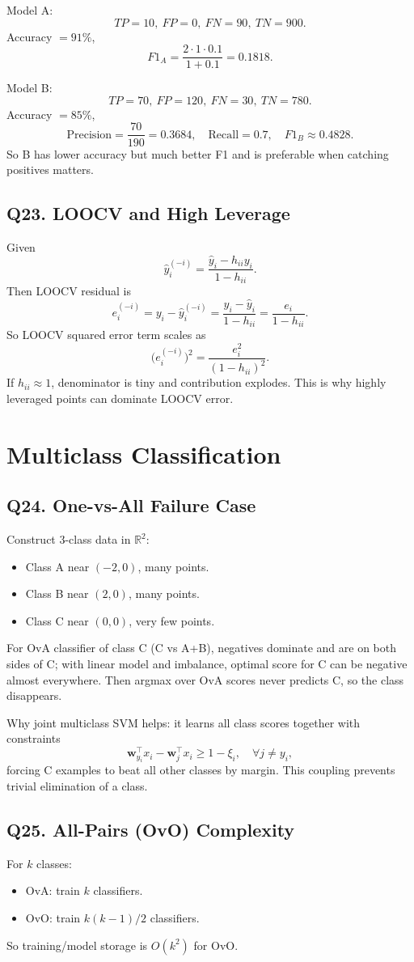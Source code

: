 \documentclass[11pt]{article}
\newcommand{\R}{\mathbb{R}}
\newcommand{\1}{\mathbf{1}}
\newcommand{\ww}{\mathbf{w}}
\begin{document}
Model A:
\[
TP=10,\ FP=0,\ FN=90,\ TN=900.
\]
Accuracy $=91\%$,
\[
F1_A=\frac{2\cdot1\cdot0.1}{1+0.1}=0.1818.
\]

Model B:
\[
TP=70,\ FP=120,\ FN=30,\ TN=780.
\]
Accuracy $=85\%$,
\[
\text{Precision}=\frac{70}{190}=0.3684,\quad
\text{Recall}=0.7,
\quad F1_B\approx0.4828.
\]
So B has lower accuracy but much better F1 and is preferable when catching positives matters.

\subsection*{Q23. LOOCV and High Leverage}
Given
\[
\hat y_i^{(-i)}=\frac{\hat y_i-h_{ii}y_i}{1-h_{ii}}.
\]
Then LOOCV residual is
\[
e_i^{(-i)}=y_i-\hat y_i^{(-i)}
=\frac{y_i-\hat y_i}{1-h_{ii}}=\frac{e_i}{1-h_{ii}}.
\]
So LOOCV squared error term scales as
\[
\big(e_i^{(-i)}\big)^2=\frac{e_i^2}{(1-h_{ii})^2}.
\]
If $h_{ii}\approx1$, denominator is tiny and contribution explodes. This is why highly leveraged points can dominate LOOCV error.

\section{Multiclass Classification}

\subsection*{Q24. One-vs-All Failure Case}
Construct 3-class data in $\R^2$:
\begin{itemize}
\item Class A near $(-2,0)$, many points.
\item Class B near $(2,0)$, many points.
\item Class C near $(0,0)$, very few points.
\end{itemize}
For OvA classifier of class C (C vs A+B), negatives dominate and are on both sides of C; with linear model and imbalance, optimal score for C can be negative almost everywhere. Then argmax over OvA scores never predicts C, so the class disappears.

Why joint multiclass SVM helps: it learns all class scores together with constraints
\[
\ww_{y_i}^\top x_i-\ww_j^\top x_i\ge1-\xi_i,\quad \forall j\neq y_i,
\]
forcing C examples to beat all other classes by margin. This coupling prevents trivial elimination of a class.

\subsection*{Q25. All-Pairs (OvO) Complexity}
For $k$ classes:
\begin{itemize}
\item OvA: train $k$ classifiers.
\item OvO: train $k(k-1)/2$ classifiers.
\end{itemize}
So training/model storage is $O(k^2)$ for OvO.
\end{document}
